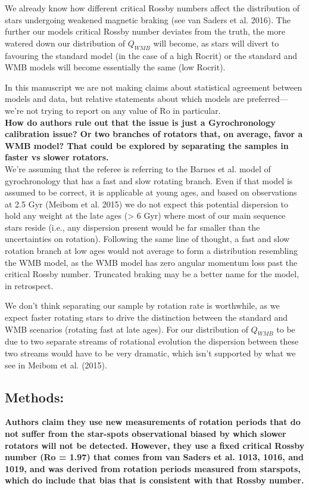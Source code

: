 \documentclass[11pt]{article}
\begin{document}
We already know how different critical Rossby numbers affect the distribution of stars undergoing weakened magnetic braking (see van Saders et al. 2016). The further our models critical Rossby number deviates from the truth, the more watered down our distribution of $Q_{WMB}$ will become, as stars will divert to favouring the standard model (in the case of a high Rocrit) or the standard and WMB models will become essentially the same (low Rocrit).

In this manuscript we are not making claims about statistical agreement between models and data, but relative statements about which models are preferred--- we’re not trying to report on any value of Ro in particular.\\

\noindent\textbf{How do authors rule out that the issue is just a Gyrochronology calibration issue? Or two branches of rotators that, on average, favor a WMB model? That could be explored by separating the samples in faster vs slower rotators.}\\

We’re assuming that the referee is referring to the Barnes et al. model of gyrochronology that has a fast and slow rotating branch. Even if that model is assumed to be correct, it is applicable at young ages, and based on observations at 2.5 Gyr (Meibom et al. 2015) we do not expect this potential dispersion to hold any weight at the late ages (> 6 Gyr) where most of our main sequence stars reside (i.e., any dispersion present would be far smaller than the uncertainties on rotation). Following the same line of thought, a fast and slow rotation branch at low ages would not average to form a distribution resembling the WMB model, as the WMB model has zero angular momentum loss past the critical Rossby number. Truncated braking may be a better name for the model, in retrospect.

We don’t think separating our sample by rotation rate is worthwhile, as we expect faster rotating stars to drive the distinction between the standard and WMB scenarios (rotating fast at late ages). For our distribution of $Q_{WMB}$ to be due to two separate streams of rotational evolution the dispersion between these two streams would have to be very dramatic, which isn’t supported by what we see in Meibom et al. (2015).\\

\subsection*{Methods:}
\noindent\textbf{Authors claim they use new measurements of rotation periods that do not suffer from the star-spots observational biased by which slower rotators will not be detected. However, they use a fixed critical Rossby number (Ro = 1.97) that comes from van Saders et al. 1013, 1016, and 1019, and was derived from rotation periods measured from starspots, which do include that bias that is consistent with that Rossby number.}\\
\end{document}
